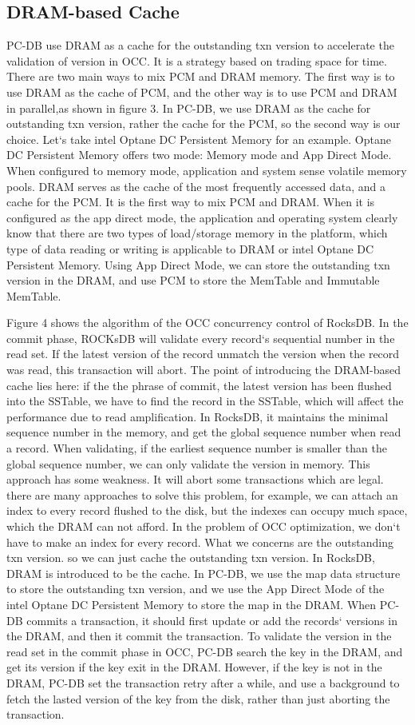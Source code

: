 \subsection{DRAM-based Cache}
PC-DB use DRAM as a cache for the outstanding txn version to accelerate the validation of version in OCC. It is a strategy based on trading space for time. 
There are two main ways to mix PCM and DRAM memory. The first way is to use DRAM as the cache of PCM, and the other way is to use PCM and DRAM in parallel,as shown in figure 3. In PC-DB, we use DRAM as the cache for outstanding txn version, rather the cache for the PCM, so the second way is our choice.
Let`s take intel Optane DC Persistent Memory for an example. Optane DC Persistent Memory offers two mode: Memory mode and App Direct Mode. When configured to memory mode, application and system sense volatile memory pools. DRAM serves as the cache of the most frequently accessed data, and a cache for the PCM. It is the first way to mix PCM and DRAM. When it is configured as the app direct mode, the application and operating system clearly know that there are two types of load/storage memory in the platform, which type of data reading or writing is applicable to DRAM or intel Optane DC Persistent Memory. Using App Direct Mode, we can store the outstanding txn version in the DRAM, and use PCM to store the MemTable and Immutable MemTable.

Figure 4 shows the algorithm of the OCC concurrency control of RocksDB. In the commit phase, ROCKsDB will validate every record`s sequential number in the  read set. If the latest version of the record unmatch the version when the record was read, this transaction will abort. The point of introducing the DRAM-based cache lies here: if the the phrase of commit, the latest version has been flushed into the SSTable, we have to find the record in the SSTable, which will affect the performance due to read amplification. In RocksDB, it maintains the minimal sequence number in the memory, and get the global sequence number when read a record. When validating, if the earliest sequence number is smaller than the global sequence number, we can only validate the version in memory. This approach has some weakness. It will abort some transactions which are legal. there are many approaches to solve this problem, for example, we can attach an index to every record flushed to the disk, but the indexes can occupy much space, which the DRAM can not afford. In the problem of OCC optimization, we don`t have to make an index for every record. What we concerns are the outstanding txn version. so we can just cache the outstanding txn version. In RocksDB, DRAM is introduced to be the cache.
In PC-DB, we use the map data structure to store the outstanding txn version, and we use the App Direct Mode of the intel Optane DC Persistent Memory to store the map in the DRAM. When PC-DB commits a transaction, it should first update or add the records` versions in the DRAM, and then it commit the transaction. To validate the version in the read set in the commit phase in OCC, PC-DB search the key in the DRAM, and get its version if the key exit in the DRAM. However, if the key is not in the DRAM, PC-DB set the transaction retry after a while, and use a background to fetch the lasted version of the key from the disk, rather than just aborting the transaction. 
